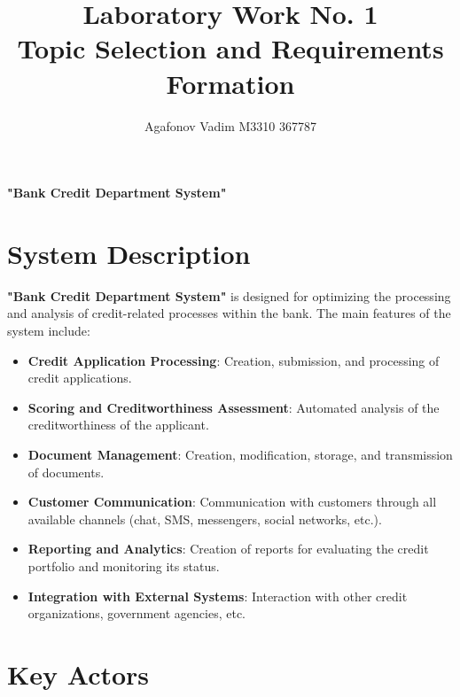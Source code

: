 \documentclass[20pt]{article}
\begin{document}
\pagestyle{empty}
\normalsize

\title{Laboratory Work No. 1 \\
Topic Selection and Requirements Formation}
\author{Agafonov Vadim M3310 367787}
\date{}
\maketitle

\centerline{\LARGE\textbf{"Bank Credit Department System"}}

\section{System Description}

\textbf{"Bank Credit Department System"} is designed for optimizing the processing and analysis of credit-related processes within the bank. The main features of the system include:

\begin{itemize}
    \item \textbf{Credit Application Processing}: Creation, submission, and processing of credit applications.
    \item \textbf{Scoring and Creditworthiness Assessment}: Automated analysis of the creditworthiness of the applicant.
    \item \textbf{Document Management}: Creation, modification, storage, and transmission of documents.
    \item \textbf{Customer Communication}: Communication with customers through all available channels (chat, SMS, messengers, social networks, etc.).
    \item \textbf{Reporting and Analytics}: Creation of reports for evaluating the credit portfolio and monitoring its status.
    \item \textbf{Integration with External Systems}: Interaction with other credit organizations, government agencies, etc.
\end{itemize}

\section{Key Actors}
\end{document}
